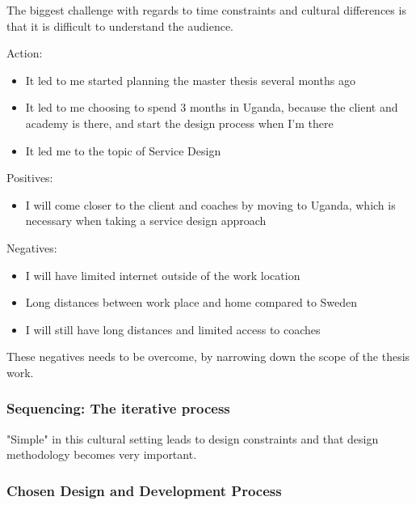 
The biggest challenge with regards to time constraints and cultural differences is that it is difficult to understand the audience.

Action:
\begin{itemize}
    \item It led to me started planning the master thesis several months ago
    \item It led to me choosing to spend 3 months in Uganda, because the client and academy is there, and start the design process when I'm there
    \item It led me to the topic of Service Design
\end{itemize}

Positives:
\begin{itemize}
    \item I will come closer to the client and coaches by moving to Uganda, which is necessary when taking a service design approach
\end{itemize}

Negatives:
\begin{itemize}
    \item I will have limited internet outside of the work location
    \item Long distances between work place and home compared to Sweden
    \item I will still have long distances and limited access to coaches\\
\end{itemize}

These negatives needs to be overcome, by narrowing down the scope of the thesis work.

\subsubsection{Sequencing: The iterative process}

"Simple" in this cultural setting leads to design constraints and that design methodology becomes very important.

\subsubsection{Chosen Design and Development Process}

